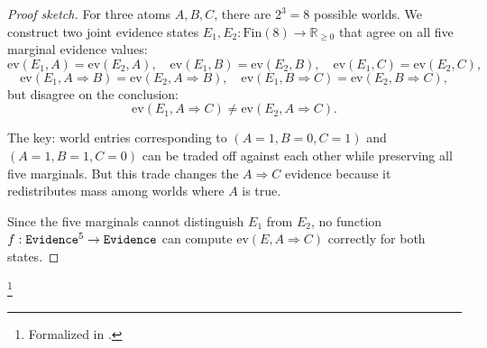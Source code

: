 \documentclass[11pt,openany]{report}
\begin{document}
\begin{proof}[Proof sketch]
For three atoms $A, B, C$, there are $2^3 = 8$ possible worlds.
We construct two joint evidence states $E_1, E_2 :
\mathrm{Fin}(8) \to \mathbb{R}_{\ge 0}$ that agree on all five
marginal evidence values:
\[
  \mathrm{ev}(E_1, A) = \mathrm{ev}(E_2, A), \quad
  \mathrm{ev}(E_1, B) = \mathrm{ev}(E_2, B), \quad
  \mathrm{ev}(E_1, C) = \mathrm{ev}(E_2, C),
\]
\[
  \mathrm{ev}(E_1, A \!\Rightarrow\! B) = \mathrm{ev}(E_2, A \!\Rightarrow\! B), \quad
  \mathrm{ev}(E_1, B \!\Rightarrow\! C) = \mathrm{ev}(E_2, B \!\Rightarrow\! C),
\]
but disagree on the conclusion:
\[
  \mathrm{ev}(E_1, A \!\Rightarrow\! C) \ne \mathrm{ev}(E_2, A \!\Rightarrow\! C).
\]

The key: world entries corresponding to $(A\!=\!1, B\!=\!0, C\!=\!1)$
and $(A\!=\!1, B\!=\!1, C\!=\!0)$ can be traded off against each other
while preserving all five marginals.  But this trade changes the
$A \Rightarrow C$ evidence because it redistributes mass among worlds
where $A$ is true.

Since the five marginals cannot distinguish $E_1$ from $E_2$, no
function $f : \mathtt{Evidence}^5 \to \mathtt{Evidence}$ can compute $\mathrm{ev}(E, A \!\Rightarrow\! C)$
correctly for both states.
\end{proof}%
\footnote{Formalized in .}
\end{document}
